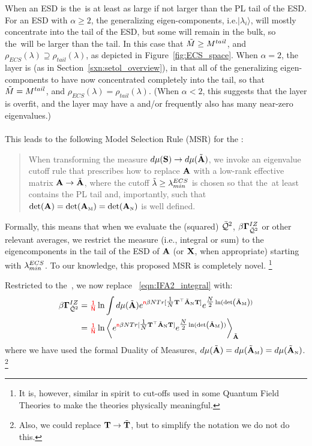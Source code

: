 When an ESD is \emph{\FatTailed} the~\ECS is at least as large if not larger than the PL tail of the ESD.
For an ESD with $\alpha\ge 2$, the generalizing eigen-components, i.e.$|\lambda_{i}\rangle$, will mostly
concentrate into the tail of the ESD, but some will remain in the bulk, so
the~\ECS will be larger than the tail.
In this case that $\tilde{M}\ge M^{tail}$,
and
$\rho_{ECS}(\lambda)\supseteq\rho_{tail}(\lambda)$, as depicted in Figure~\ref{fig:ECS_space}.
When $\alpha=2$,  the layer is \Ideal (as in Section~\ref{sxn:setol_overview}),
in that all of the generalizing eigen-components to have now concentrated completely into the tail, so that
 $\tilde{M}=M^{tail}$,
and
$\rho_{ECS}(\lambda)=\rho_{tail}(\lambda)$.
(When $\alpha< 2$, this suggests that the layer is overfit, and the layer may have a \CorrelationTrap and/or
frequently also has many near-zero eigenvalues.)
\\
\\
This leads to the following Model Selection Rule (MSR) for the \ECS:
\begin{quote}
  When transforming the measure $d\mu({\mathbf{S}}) \rightarrow d\mu(\tilde{\mathbf{A}})$, we invoke an eigenvalue cutoff rule that
  prescribes how to replace $\mathbf{A}$ with a low-rank effective matrix $\mathbf{A}\rightarrow\tilde{\mathbf{A}}$,
  where the cutoff $\tilde{\lambda}\ge\lambda^{ECS}_{min}$ is chosen so that the~\ECS at least contains the PL tail
  and, importantly, such that $\det(\mathbf{A})=\det({\mathbf{A}}_{\text{\tiny M}})=\det({\mathbf{A}}_{\text{\tiny N}})$ is well defined.  
\end{quote}
Formally, this means that when we evaluate the \Quality (squared) $\bar{\mathcal{Q}}^{2}$, \GeneratingFunction $\beta\mathbf{\Gamma}^{IZ}_{\bar{\mathcal{Q}}^{2}}$
or other relevant averages, we restrict the measure (i.e., integral or sum) to the eigencomponents in the tail of the ESD of
$\mathbf{A}$ (or $\mathbf{X}$, when appropriate)
starting with $\lambda^{ECS}_{min}$.  
To our knowledge, this proposed MSR is completely novel.%
\footnote{It is, however, similar in spirit to cut-offs used in some Quantum Field Theories to make the theories physically meaningful.}

Restricted to the~\ECS, we now replace \EQN~\ref{eqn:IFA2_integral} with:
\begin{align}
  \nonumber 
  \beta\mathbf{\Gamma}^{IZ}_{\bar{\mathcal{Q}}^{2}} 
  &=
    {\color{red}\sf{\tfrac{1}{N}}}
  \ln \int d\mu(\tilde{\mathbf{A}})
  e^{{\color{red}\sf{n}}\beta N Tr[\tfrac{1}{N}{\mathbf{T}}^{\top}\tilde{\mathbf{A}}_{\text{\tiny N}}{\mathbf{T}}] }
  e^{\tfrac{N}{2}\ln(\mbox{}{\text{det}}\left(\tilde{\mathbf{A}}_{\text{\tiny M}}\right))} \\
  \label{eqn:IFA2_braket}
  & =
    {\color{red}\sf{\tfrac{1}{N}}}
  \ln
  \left\langle
  e^{{\color{red}\sf{n}}\beta N Tr[\tfrac{1}{N}{\mathbf{T}}^{\top}\tilde{\mathbf{A}}_{\text{\tiny N}}{\mathbf{T}}] }
  e^{\tfrac{N}{2}\ln(\mbox{}{\text{det}}\left(\tilde{\mathbf{A}}_{\text{\tiny M}}\right))}
    \right\rangle_{\tilde{\mathbf{A}}}
\end{align}
where we have used the formal Duality of Measures, $d\mu(\tilde{\mathbf{A}})=d\mu(\tilde{\mathbf{A}}_{\text{\tiny M}})=d\mu(\tilde{\mathbf{A}}_{\text{\tiny N}})$.
\footnote{Also, we could replace ${\mathbf{T}}\rightarrow\tilde{\mathbf{T}}$, but to simplify the notation we do not do this.}

